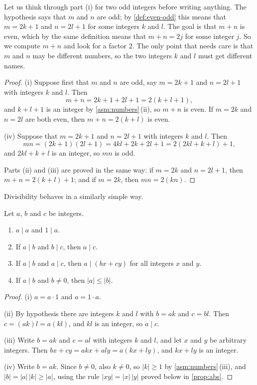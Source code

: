 Let us think through part (i) for two odd integers before writing anything. The hypothesis says that $m$ and $n$ are odd; by \cref{def:even-odd} this means that $m=2k+1$ and $n=2l+1$ for some integers $k$ and $l$. The goal is that $m+n$ is even, which by the same definition means that $m+n=2j$ for some integer $j$. So we compute $m+n$ and look for a factor $2$. The only point that needs care is that $m$ and $n$ may be different numbers, so the two integers $k$ and $l$ must get different names.

\begin{proof}
(i) Suppose first that $m$ and $n$ are odd, say $m=2k+1$ and $n=2l+1$ with integers $k$ and $l$. Then
\[
m+n=2k+1+2l+1=2(k+l+1),
\]
and $k+l+1$ is an integer by \cref{asm:numbers}\,(ii), so $m+n$ is even. If $m=2k$ and $n=2l$ are both even, then $m+n=2(k+l)$ is even.

(iv) Suppose that $m=2k+1$ and $n=2l+1$ with integers $k$ and $l$. Then
\[
mn=(2k+1)(2l+1)=4kl+2k+2l+1=2(2kl+k+l)+1,
\]
and $2kl+k+l$ is an integer, so $mn$ is odd.

Parts (ii) and (iii) are proved in the same way: if $m=2k$ and $n=2l+1$, then $m+n=2(k+l)+1$; and if $m=2k$, then $mn=2(kn)$.
\end{proof}

Divisibility behaves in a similarly simple way.

\begin{proposition}
\label{prop:divisibility}
Let $a$, $b$ and $c$ be integers.
\begin{enumerate}
\item $a\mid a$ and $1\mid a$.
\item If $a\mid b$ and $b\mid c$, then $a\mid c$.
\item If $a\mid b$ and $a\mid c$, then $a\mid(bx+cy)$ for all integers $x$ and $y$.
\item If $a\mid b$ and $b\ne0$, then $|a|\le|b|$.
\end{enumerate}
\end{proposition}

\begin{proof}
(i) $a=a\cdot1$ and $a=1\cdot a$.

(ii) By hypothesis there are integers $k$ and $l$ with $b=ak$ and $c=bl$. Then $c=(ak)l=a(kl)$, and $kl$ is an integer, so $a\mid c$.

(iii) Write $b=ak$ and $c=al$ with integers $k$ and $l$, and let $x$ and $y$ be arbitrary integers. Then $bx+cy=akx+aly=a(kx+ly)$, and $kx+ly$ is an integer.

(iv) Write $b=ak$. Since $b\ne0$, also $k\ne0$, so $|k|\ge1$ by \cref{asm:numbers}\,(iii), and $|b|=|a|\,|k|\ge|a|$, using the rule $|xy|=|x|\,|y|$ proved below in \cref{prop:abs}.
\end{proof}

